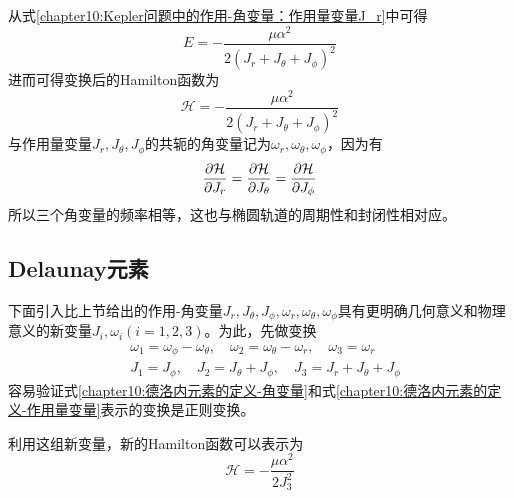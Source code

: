 从式\eqref{chapter10:Kepler问题中的作用-角变量：作用量变量J_r}中可得
\begin{equation}
	E = -\frac{\mu\alpha^2}{2(J_r+J_\theta+J_\phi)^2}
\end{equation}
进而可得变换后的Hamilton函数为
\begin{equation}
	\mathcal{H} = -\frac{\mu\alpha^2}{2(J_r+J_\theta+J_\phi)^2}
\end{equation}
与作用量变量$J_r, J_\theta, J_\phi$的共轭的角变量记为$\omega_r, \omega_\theta, \omega_\phi$，因为有
\begin{equation*}
	\frac{\partial \mathcal{H}}{\partial J_r} = \frac{\partial \mathcal{H}}{\partial J_\theta} = \frac{\partial \mathcal{H}}{\partial J_\phi}
\end{equation*}
所以三个角变量的频率相等，这也与椭圆轨道的周期性和封闭性相对应。

\subsection{Delaunay元素}

下面引入比上节给出的作用-角变量$J_r, J_\theta, J_\phi, \omega_r, \omega_\theta, \omega_\phi$具有更明确几何意义和物理意义的新变量$J_i, \omega_i(i=1,2,3)$。为此，先做变换
\begin{align}
	& \omega_1 = \omega_\phi-\omega_\theta,\quad \omega_2 = \omega_\theta-\omega_r,\quad \omega_3 = \omega_r \label{chapter10:德洛内元素的定义-角变量} \\
	& J_1 = J_\phi,\quad J_2 = J_\theta+J_\phi,\quad J_3 = J_r+J_\theta+J_\phi \label{chapter10:德洛内元素的定义-作用量变量}
\end{align}
容易验证式\eqref{chapter10:德洛内元素的定义-角变量}和式\eqref{chapter10:德洛内元素的定义-作用量变量}表示的变换是正则变换。

利用这组新变量，新的Hamilton函数可以表示为
\begin{equation}
	\mathcal{H} = -\frac{\mu\alpha^2}{2J_3^2}
\end{equation}

